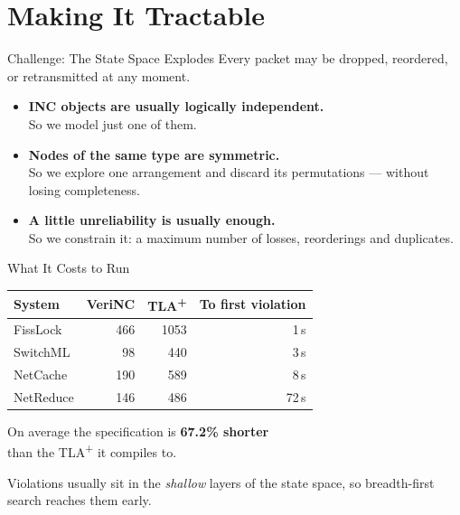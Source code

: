 \section{Making It Tractable}

\begin{frame}{Challenge: The State Space Explodes}
  \vspace{0.4em}
  Every packet may be dropped, reordered, or retransmitted at any moment.
  \vspace{1.0em}
  \begin{itemize}
    \item<2-> \textbf{INC objects are usually logically independent.}\\
          So we model just one of them.
    \vspace{0.6em}
    \item<3-> \textbf{Nodes of the same type are symmetric.}\\
          So we explore one arrangement and discard its permutations ---
          without losing completeness.
    \vspace{0.6em}
    \item<4-> \textbf{A little unreliability is usually enough.}\\
          So we constrain it: a maximum number of losses, reorderings
          and duplicates.
  \end{itemize}
\end{frame}

\begin{frame}{What It Costs to Run}
  \vspace{0.2em}
  \begin{center}
    \footnotesize
    \renewcommand{\arraystretch}{0.95}
    \begin{tabular}{@{}lrrr@{}}
      \toprule
      \textbf{System} & \textbf{VeriNC} & \textbf{TLA\textsuperscript{+}}
        & \textbf{To first violation} \\
      \midrule
      FissLock  & 466 & 1053 & 1\,s \\
      SwitchML  &  98 &  440 & 3\,s \\
      NetCache  & 190 &  589 & 8\,s \\
      NetReduce & 146 &  486 & 72\,s \\
      \bottomrule
    \end{tabular}
  \end{center}
  \vspace{0.6em}
  \begin{center}
    \begin{minipage}{0.94\textwidth}
      \centering
      On average the specification is \textbf{67.2\% shorter}\\
      than the TLA\textsuperscript{+} it compiles to.
      \vspace{0.5em}

      Violations usually sit in the \emph{shallow} layers of the state space,
      so breadth-first search reaches them early.
    \end{minipage}
  \end{center}
\end{frame}
